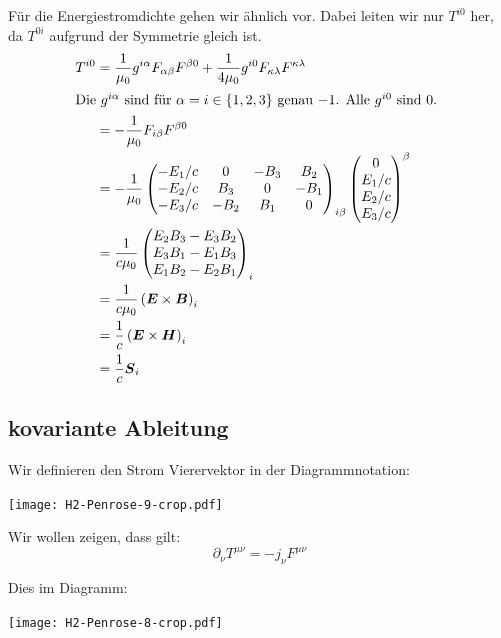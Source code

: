 Für die Energiestromdichte gehen wir ähnlich vor. Dabei leiten wir nur $T^{i0}$
her, da $T^{0i}$ aufgrund der Symmetrie gleich ist.
\begin{align*}
	T^{i0}
	&= \frac1{\mu_0} g^{i\alpha} F_{\alpha\beta} F^{\beta0} + \frac1{4\mu_0} g^{i0} F_{\kappa\lambda} F^{\kappa\lambda} \\
	\intertext{%
		Die $g^{i\alpha}$ sind für $\alpha = i \in \set{1, 2, 3}$ genau $-1$. Alle
		$g^{i0}$ sind 0.
	}
	&= - \frac1{\mu_0} F_{i\beta} F^{\beta0} \\
	&= - \frac1{\mu_0}
	\begin{pmatrix}
		- E_1/c & 0 & -B_3 & B_2 \\
		- E_2/c & B_3 & 0 & -B_1 \\
		- E_3/c & -B_2 & B_1 & 0 \\
	\end{pmatrix}_{i\beta}
	\begin{pmatrix}
		0 \\ E_1/c \\ E_2/c \\ E_3/c
	\end{pmatrix}^{\beta}
	\\
	&= \frac1{c\mu_0}
	\begin{pmatrix}
		E_2B_3 - E_3B_2 \\
		E_3B_1 - E_1B_3 \\
		E_1B_2 - E_2B_1
	\end{pmatrix}_i \\
	&= \frac1{c\mu_0} \del{\vec E \times \vec B}_i \\
	&= \frac1{c} \del{\vec E \times \vec H}_i \\
	&= \frac1{c} \vec S_i \\
\end{align*}

\subsection{kovariante Ableitung}

Wir definieren den Strom Vierervektor in der Diagrammnotation:
\begin{center}
	\texttt{[image: H2-Penrose-9-crop.pdf]}
\end{center}

Wir wollen zeigen, dass gilt:
\[
	\partial_\nu T^{\mu\nu} = - j_\nu F^{\mu\nu}
\]

Dies im Diagramm:
\begin{center}
	\texttt{[image: H2-Penrose-8-crop.pdf]}
\end{center}

